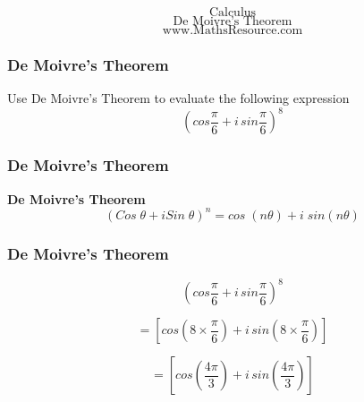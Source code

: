 \documentclass{beamer}
\begin{document}
\begin{frame}


{
\huge
\[ \mbox{Calculus} \]
\[ \mbox{De Moivre's Theorem} \]
}
{
\Large
\[ \mbox{www.MathsResource.com} \]
}
\end{frame}

\begin{frame}
\frametitle{De Moivre's Theorem}
\Large
\vspace{-2cm}
Use De Moivre's Theorem to evaluate the following expression
\[\left( cos \frac{\pi}{6} + i\, sin\frac{\pi}{6} \right)^8\]

\end{frame}

\begin{frame}
\frametitle{De Moivre's Theorem}
\Large
\vspace{-2cm}
\textbf{De Moivre's Theorem}
{
	\LARGE
\[(Cos\; \theta + i Sin\; \theta)^n = cos\;(n\theta) + i \;sin (n \theta) \]
}
\end{frame}



\begin{frame}
\frametitle{De Moivre's Theorem}
\LARGE
\[ \left( cos \frac{\pi}{6} + i\, sin\frac{\pi}{6} \right) ^8\]

\[ = \left[ cos \left(8 \times \frac{\pi}{6} \right) + i\, sin \left(8 \times \frac{\pi}{6} \right) \right] \]

\[ = \left[ cos \left(\frac{4\pi}{3} \right)+ i\, sin \left(\frac{4\pi}{3} \right)\right] \]
\end{frame}
\end{document}
